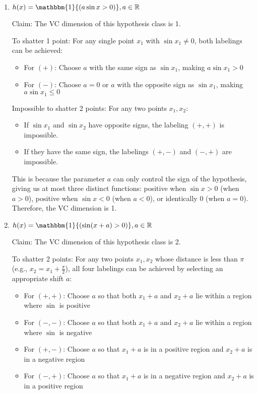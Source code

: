 \documentclass[a4paper]{article}
\begin{document}
\begin{enumerate}
    \item \textbf{$h(x) = \mathbbm{1}{(a \sin x > 0)}, a \in \mathbb{R}$}
    
    Claim: The VC dimension of this hypothesis class is 1.
    
    To shatter 1 point: For any single point $x_1$ with $\sin x_1 \neq 0$, both labelings can be achieved:
    \begin{itemize}
        \item For $(+)$: Choose $a$ with the same sign as $\sin x_1$, making $a \sin x_1 > 0$
        \item For $(-)$: Choose $a = 0$ or $a$ with the opposite sign as $\sin x_1$, making $a \sin x_1 \leq 0$
    \end{itemize}
    
    Impossible to shatter 2 points: For any two points $x_1, x_2$:
    \begin{itemize}
        \item If $\sin x_1$ and $\sin x_2$ have opposite signs, the labeling $(+,+)$ is impossible.
        \item If they have the same sign, the labelings $(+,-)$ and $(-,+)$ are impossible.
    \end{itemize}
    
    This is because the parameter $a$ can only control the sign of the hypothesis, giving us at most three distinct functions: positive when $\sin x > 0$ (when $a > 0$), positive when $\sin x < 0$ (when $a < 0$), or identically 0 (when $a = 0$). Therefore, the VC dimension is 1.\\

    \item \textbf{$h(x) = \mathbbm{1}{(\sin(x + a) > 0)}, a \in \mathbb{R}$}
    
    Claim: The VC dimension of this hypothesis class is 2.
    
    To shatter 2 points: For any two points $x_1, x_2$ whose distance is less than $\pi$ (e.g., $x_2 = x_1 + \frac{\pi}{2}$), all four labelings can be achieved by selecting an appropriate shift $a$:
    \begin{itemize}
        \item For $(+,+)$: Choose $a$ so that both $x_1 + a$ and $x_2 + a$ lie within a region where $\sin$ is positive
        \item For $(-,-)$: Choose $a$ so that both $x_1 + a$ and $x_2 + a$ lie within a region where $\sin$ is negative
        \item For $(+,-)$: Choose $a$ so that $x_1 + a$ is in a positive region and $x_2 + a$ is in a negative region
        \item For $(-,+)$: Choose $a$ so that $x_1 + a$ is in a negative region and $x_2 + a$ is in a positive region
    \end{itemize}
    

\end{enumerate}
\end{document}
